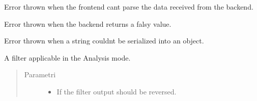 \documentclass[letterpaper,10pt,italian]{sphinxmanual}
\begin{document}

\begin{fulllineitems}
\label{\detokenize{code/frontend/index:DecodeError}}
\sphinxAtStartPar
Error thrown when the frontend can\textquotesingle{}t parse the data received from the backend.

\end{fulllineitems}


\begin{fulllineitems}
\label{\detokenize{code/frontend/index:ResultError}}
\sphinxAtStartPar
Error thrown when the backend returns a falsy  value.

\end{fulllineitems}


\begin{fulllineitems}
\label{\detokenize{code/frontend/index:SerializationError}}
\sphinxAtStartPar
Error thrown when a string couldn\textquotesingle{}t be serialized into an object.

\end{fulllineitems}


\begin{fulllineitems}
\label{\detokenize{code/frontend/index:Filter}}
\sphinxAtStartPar
A filter applicable in the Analysis mode.
\begin{quote}\begin{description}
\item[{Parametri}] \leavevmode\begin{itemize}
\item {} 
\sphinxAtStartPar
{} \sphinxhyphen{}\sphinxhyphen{} If the filter output should be reversed.

\end{itemize}

\end{description}\end{quote}

\end{fulllineitems}
\end{document}
